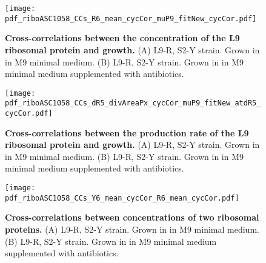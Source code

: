 



\begin{figure}
    \centering
    \texttt{[image: pdf\_riboASC1058\_CCs\_R6\_mean\_cycCor\_muP9\_fitNew\_cycCor.pdf]}
    \caption{ 
        \textbf{Cross-correlations between the concentration of the L9 ribosomal protein and growth.}
        (A) L9-R, S2-Y strain. Grown in in M9 minimal medium.
        (B) L9-R, S2-Y strain. Grown in in M9 minimal medium supplemented with antibiotics. 
%
    }
    \label{fig:ribo:CCsEmuL9}
\end{figure}

\begin{figure}
    \centering
    \texttt{[image: pdf\_riboASC1058\_CCs\_dR5\_divAreaPx\_cycCor\_muP9\_fitNew\_atdR5\_cycCor.pdf]}
    \caption{ 
        \textbf{Cross-correlations between the production rate of the L9 ribosomal protein and growth.}
        (A) L9-R, S2-Y strain. Grown in in M9 minimal medium.
        (B) L9-R, S2-Y strain. Grown in in M9 minimal medium supplemented with antibiotics. 
%
    }
    \label{fig:ribo:CCsPmuL9}
\end{figure}



\begin{figure}
    \centering
    \texttt{[image: pdf\_riboASC1058\_CCs\_Y6\_mean\_cycCor\_R6\_mean\_cycCor.pdf]}
    \caption{ 
        \textbf{Cross-correlations between concentrations of two ribosomal proteins.}
        (A) L9-R, S2-Y strain. Grown in in M9 minimal medium.
        (B) L9-R, S2-Y strain. Grown in in M9 minimal medium supplemented with antibiotics.
    }
    \label{fig:ribo:CCsEERiboribo}
\end{figure}


